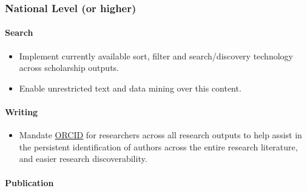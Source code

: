 \subsubsection{National Level (or
higher)}\label{national-level-or-higher}

\paragraph{Search}\label{search-2}

\begin{itemize}
\item
  Implement currently available sort, filter and search/discovery
  technology across scholarship outputs.
\item
  Enable unrestricted text and data mining over this content.
\end{itemize}

\paragraph{Writing}\label{writing-2}

\begin{itemize}
\tightlist
\item
  Mandate \href{https://orcid.org/}{ORCID} for researchers across all
  research outputs to help assist in the persistent identification of
  authors across the entire research literature, and easier research
  discoverability.
\end{itemize}

\paragraph{Publication}\label{publication-3}

